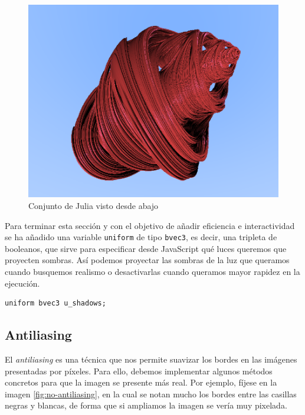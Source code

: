 \begin{figure} [ht]
    \centering
    \includegraphics[scale = 0.45]{img/C8/desde-abajo.png}
    \caption{Conjunto de Julia visto desde abajo}
    \label{fig:desde-abajo}
\end{figure}

Para terminar esta sección y con el objetivo de añadir eficiencia e interactividad se ha añadido una variable \verb|uniform| de tipo \verb|bvec3|, es decir, una tripleta de booleanos, que sirve para especificar desde JavaScript qué luces queremos que proyecten sombras. Así podemos proyectar las sombras de la luz que queramos cuando busquemos realismo o desactivarlas cuando queramos mayor rapidez en la ejecución.

\begin{lstlisting}
uniform bvec3 u_shadows;
\end{lstlisting}


\subsection{Antiliasing}

El \textit{antiliasing} es una técnica que nos permite suavizar los bordes en las imágenes presentadas por píxeles. Para ello, debemos implementar algunos métodos concretos para que la imagen se presente más real. Por ejemplo, fíjese en la imagen \ref{fig:no-antiliasing}, en la cual se notan mucho los bordes entre las casillas negras y blancas, de forma que si ampliamos la imagen se vería muy pixelada.


